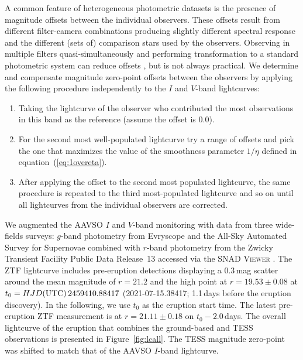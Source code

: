 \documentclass[twocolumn]{aastex631}
\begin{document}
A common feature of heterogeneous photometric datasets is 
the presence of magnitude offsets between the individual observers.
These offsets result from different filter-camera combinations producing slightly different
spectral response and the different (sets of) comparison stars used by the observers.
%
Observing in multiple filters quasi-simultaneously and performing transformation 
to a standard photometric system can reduce offsets \citep[e.g.,][]{2007iap..book.....B,2012JAVSO..40..990B}, 
but is not always practical.
%
We determine and compensate magnitude zero-point offsets between the observers 
by applying the following procedure independently to the $I$ and $V$-band lightcurves:
\begin{enumerate}
\item Taking the lightcurve of the observer who contributed the most observations in this
band as the reference (assume the offset is 0.0).
\item For the second most well-populated lightcurve try a range of offsets 
and pick the one that maximizes the value of the smoothness parameter
$1/\eta$ defined in equation~(\ref{eq:1overeta}).
\item After applying the offset to the second most populated lightcurve, the
same procedure is repeated to the third most-populated lightcurve and so on
until all lightcurves from the individual observers are corrected.
\end{enumerate}

We augmented the AAVSO $I$ and $V$-band monitoring with data from three wide-fields surveys: 
$g$-band photometry from Evryscope \citep{2014SPIE.9145E..0ZL} and 
the All-Sky Automated Survey for Supernovae \citep[ASAS-SN][]{2014ApJ...788...48S,2017PASP..129j4502K}
combined with $r$-band photometry from the Zwicky Transient Facility \citep[ZTF][]{2019PASP..131a8003M} 
Public Data Release~13 accessed via the \textsc{SNAD Viewer}
\citep{2023PASP..135b4503M}.
The ZTF lightcurve includes pre-eruption detections displaying a 0.3\,mag
scatter around the mean magnitude of $r = 21.2$ and the high point at 
$r = 19.53 \pm 0.08$ at 
$t_0=HJD({\rm UTC})\,2459410.88417$ 
(2021-07-15.38417; 1.1\,days before the eruption discovery). In the following, 
we use $t_0$ as the eruption start time. The latest pre-eruption ZTF
measurement is at $r = 21.11 \pm 0.18$ on $t_0 - 2.0$\,days.
%
The overall lightcurve of the eruption that combines the ground-based and
TESS observations is presented in Figure~\ref{fig:lcall}.
%
The TESS magnitude zero-point was shifted to match that of the AAVSO $I$-band lightcurve.
\end{document}
